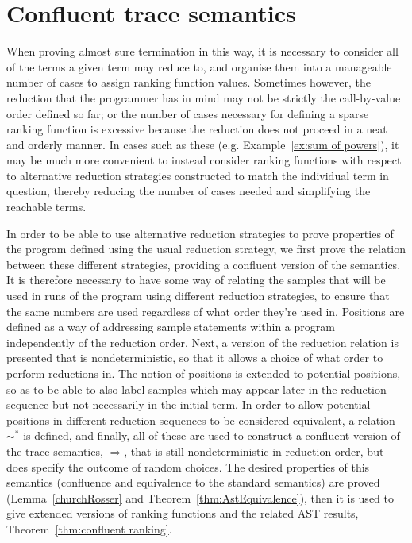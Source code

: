 \section{Confluent trace semantics}
\label{sec:confluent}

When proving almost sure termination in this way, it is necessary to consider all of the terms a given term may reduce to, and organise them into a manageable number of cases to assign ranking function values. 
Sometimes however, the reduction that the programmer has in mind may not be strictly the call-by-value order defined so far; 
or the number of cases necessary for defining a sparse ranking function is excessive because the reduction does not proceed in a neat and orderly manner. 
In cases such as these (e.g. Example~\ref{ex:sum of powers}), it may be much more convenient to instead consider ranking functions with respect to alternative reduction strategies constructed to match the individual term in question, 
thereby reducing the number of cases needed and simplifying the reachable terms. 

In order to be able to use alternative reduction strategies to prove properties of the program defined using the usual reduction strategy, we first prove the relation between these different strategies, providing a confluent version of the semantics. It is therefore necessary to have some way of relating the samples that will be used in runs of the program using different reduction strategies, to ensure that the same numbers are used regardless of what order they're used in. Positions are defined as a way of addressing sample statements within a program independently of the reduction order. Next, a version of the reduction relation is presented that is nondeterministic, so that it allows a choice of what order to perform reductions in. The notion of positions is extended to potential positions, so as to be able to also label samples which may appear later in the reduction sequence but not necessarily in the initial term. In order to allow potential positions in different reduction sequences to be considered equivalent, a relation $\sim^*$ is defined, and finally, all of these are used to construct a confluent version of the trace semantics, $\Rightarrow$, that is still nondeterministic in reduction order, but does specify the outcome of random choices. The desired properties of this semantics (confluence and equivalence to the standard semantics) are proved (Lemma~\ref{churchRosser} and Theorem~\ref{thm:AstEquivalence}), then it is used to give extended versions of ranking functions and the related AST results, Theorem~\ref{thm:confluent ranking}. 

